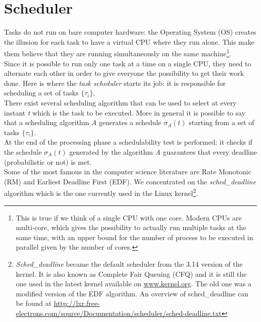 \section{Scheduler}
Tasks do not run on bare computer hardware: the Operating System (OS) creates the illusion for each task to have a virtual CPU where they run alone. This make them believe that they are running simultaneously on the same machine\footnote{This is true if we think of a single CPU with one core. Modern CPUs are multi-core, which gives the possibility to actually run multiple tasks at the same time, with an upper bound for the number of process to be executed in parallel given by the number of cores.}.\\
Since it is possible to run only one task at a time on a single CPU, they need to alternate each other in order to give everyone the possibility to get their work done. Here is where the \emph{task scheduler} starts its job: it is responsible for scheduling a set of tasks \( \{\tau_{i}\} \).\\
There exist several scheduling algorithm that can be used to select at every instant \emph{t} which is the task to be executed. More in general it is possible to say that a scheduling algorithm \emph{A} generates a schedule \( \sigma_{A}\left(t\right) \) starting from a set of tasks \( \{\tau_{i}\} \).\\
At the end of the processing phase a schedulability test is performed: it checks if the schedule \( \sigma_{A}\left(t\right) \) generated by the algorithm \emph{A} guarantees that every deadline (probabilistic or not) is met.\\
Some of the most famous in the computer science literature are Rate Monotonic (RM) and Earliest Deadline First (EDF). We concentrated on the \emph{sched\_deadline} algorithm which is the one currently used in the Linux kernel\footnote{\emph{Sched\_deadline} became the default scheduler from the 3.14 version of the kernel. It is also known as Complete Fair Queuing (CFQ) and it is still the one used in the latest kernel available on \url{www.kernel.org}. The old one was a modified version of the EDF algorithm. An overview of sched\_deadline can be found at \url{http://lxr.free-electrons.com/source/Documentation/scheduler/sched-deadline.txt}}.

